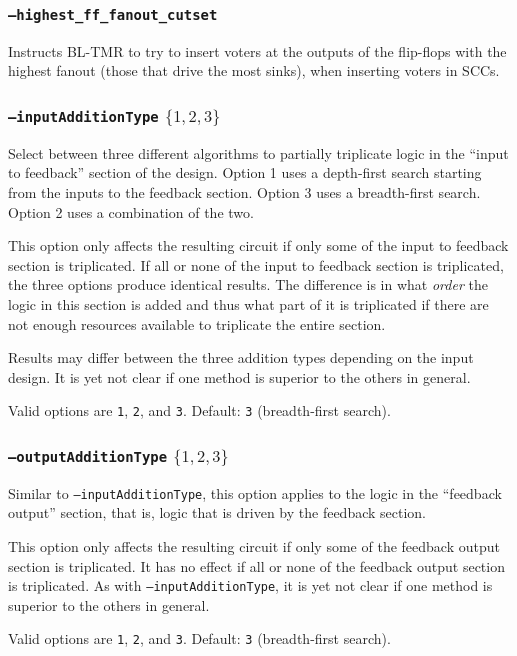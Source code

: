 \documentclass[english]{article}
\begin{document}
\subsubsection{\texttt{--highest\_ff\_fanout\_cutset}}
Instructs BL-TMR to try to insert voters at the outputs of the flip-flops with 
the highest fanout (those that drive the most sinks), when inserting voters 
in SCCs.

\subsubsection{\texttt{--inputAdditionType} $\{1,2,3\}$}
Select between three different algorithms to partially triplicate logic in the 
``input to feedback'' section of the design. Option 1 uses a depth-first search 
starting from the inputs to the feedback section. Option 3 uses a breadth-first 
search. Option 2 uses a combination of the two.

This option only affects the resulting circuit if only some of the input
to feedback section is triplicated. If all or none of the input to feedback 
section is triplicated, the three options produce identical results. The 
difference is in what \emph{order} the logic in this section is added and thus 
what part of it is triplicated if there are not enough resources available to 
triplicate the entire section.

Results may differ between the three addition types depending on the input 
design. It is yet not clear if one method is superior to the others in general. 

Valid options are \texttt{1}, \texttt{2}, and \texttt{3}. Default: \texttt{3} 
(breadth-first search).

\subsubsection{\texttt{--outputAdditionType} $\{1,2,3\}$}
Similar to \texttt{--inputAdditionType}, this option applies to the logic 
in the ``feedback output'' section, that is, logic that is driven by the
feedback section.

This option only affects the resulting circuit if only some of the feedback 
output section is triplicated. It has no effect if all or none of the feedback 
output section is triplicated. As with \texttt{--inputAdditionType}, it is yet
not clear if one method is superior to the others in general.

Valid options are \texttt{1}, \texttt{2}, and \texttt{3}. Default: \texttt{3} 
(breadth-first search).
\end{document}
